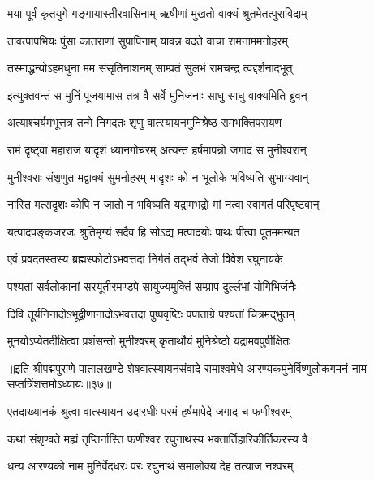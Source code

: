 \twolineshloka
{मया पूर्वं कृतयुगे गङ्गायास्तीरवासिनाम्}
{ऋषीणां मुखतो वाक्यं श्रुतमेतत्पुराविदाम्}%

\twolineshloka
{तावत्पापभियः पुंसां कातराणां सुपापिनाम्}
{यावन्न वदते वाचा रामनाममनोहरम्}%

\twolineshloka
{तस्माद्धन्योऽहमधुना मम संसृतिनाशनम्}
{साम्प्रतं सुलभं रामचन्द्र त्वद्दर्शनादभूत्}%

\twolineshloka
{इत्युक्तवन्तं स मुनिं पूजयामास तत्र वै}
{सर्वे मुनिजनाः साधु साधु वाक्यमिति ब्रुवन्}%


\twolineshloka
{अत्याश्चर्यमभूत्तत्र तन्मे निगदतः शृणु}
{वात्स्यायनमुनिश्रेष्ठ रामभक्तिपरायण}%

\twolineshloka
{रामं दृष्ट्वा महाराजं यादृशं ध्यानगोचरम्}
{अत्यन्तं हर्षमापन्नो जगाद स मुनीश्वरान्}%

\twolineshloka
{मुनीश्वराः संशृणुत मद्वाक्यं सुमनोहरम्}
{मादृशः को न भूलोके भविष्यति सुभाग्यवान्}%

\twolineshloka
{नास्ति मत्सदृशः कोपि न जातो न भविष्यति}
{यद्रामभद्रो मां नत्वा स्वागतं परिपृष्टवान्}%

\twolineshloka
{यत्पादपङ्कजरजः श्रुतिमृग्यं सदैव हि}
{सोऽद्य मत्पादयोः पाथः पीत्वा पूतममन्यत}%

\twolineshloka
{एवं प्रवदतस्तस्य ब्रह्मस्फोटोऽभवत्तदा}
{निर्गतं तद्भवं तेजो विवेश रघुनायके}%

\twolineshloka
{पश्यतां सर्वलोकानां सरयूतीरमण्डपे}
{सायुज्यमुक्तिं सम्प्राप दुर्ल्लभां योगिभिर्जनैः}%

\twolineshloka
{दिवि तूर्यनिनादोऽभूद्वीणानादोऽभवत्तदा}
{पुष्पवृष्टिः पपाताग्रे पश्यतां चित्रमद्भुतम्}%

\twolineshloka
{मुनयोऽप्येतदीक्षित्वा प्रशंसन्तो मुनीश्वरम्}
{कृतार्थोयं मुनिश्रेष्ठो यद्रामवपुषीक्षितः}%

॥इति श्रीपद्मपुराणे पातालखण्डे शेषवात्स्यायनसंवादे रामाश्वमेधे आरण्यकमुनेर्विष्णुलोकगमनं नाम सप्तत्रिंशत्तमोऽध्यायः॥३७॥



\twolineshloka
{एतदाख्यानकं श्रुत्वा वात्स्यायन उदारधीः}
{परमं हर्षमापेदे जगाद च फणीश्वरम्}%


\twolineshloka
{कथां संशृण्वते मह्यं तृप्तिर्नास्ति फणीश्वर}
{रघुनाथस्य भक्तार्तिहारिकीर्तिकरस्य वै}%

\twolineshloka
{धन्य आरण्यको नाम मुनिर्वेदधरः परः}
{रघुनाथं समालोक्य देहं तत्याज नश्वरम्}%

